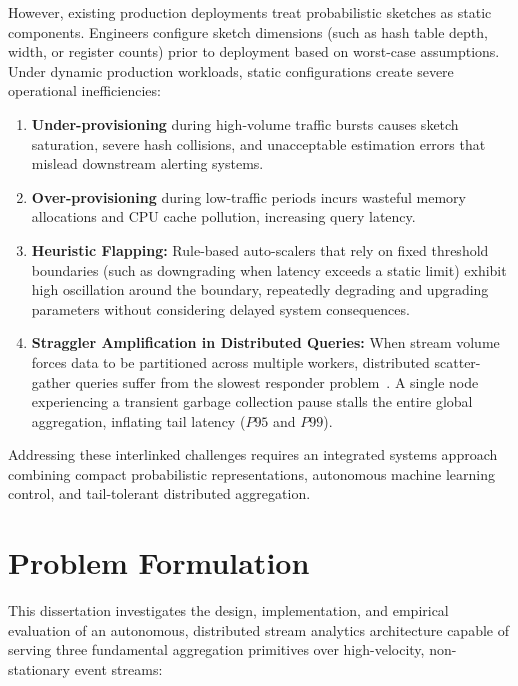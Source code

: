 However, existing production deployments treat probabilistic sketches as static components. Engineers configure sketch dimensions (such as hash table depth, width, or register counts) prior to deployment based on worst-case assumptions. Under dynamic production workloads, static configurations create severe operational inefficiencies:
\begin{enumerate}
 \item \textbf{Under-provisioning} during high-volume traffic bursts causes sketch saturation, severe hash collisions, and unacceptable estimation errors that mislead downstream alerting systems.
 \item \textbf{Over-provisioning} during low-traffic periods incurs wasteful memory allocations and CPU cache pollution, increasing query latency.
 \item \textbf{Heuristic Flapping:} Rule-based auto-scalers that rely on fixed threshold boundaries (such as downgrading when latency exceeds a static limit) exhibit high oscillation around the boundary, repeatedly degrading and upgrading parameters without considering delayed system consequences.
 \item \textbf{Straggler Amplification in Distributed Queries:} When stream volume forces data to be partitioned across multiple workers, distributed scatter-gather queries suffer from the slowest responder problem~\cite{dean2013tail}. A single node experiencing a transient garbage collection pause stalls the entire global aggregation, inflating tail latency ($P95$ and $P99$).
\end{enumerate}

Addressing these interlinked challenges requires an integrated systems approach combining compact probabilistic representations, autonomous machine learning control, and tail-tolerant distributed aggregation.

\section{Problem Formulation}

This dissertation investigates the design, implementation, and empirical evaluation of an autonomous, distributed stream analytics architecture capable of serving three fundamental aggregation primitives over high-velocity, non-stationary event streams:

